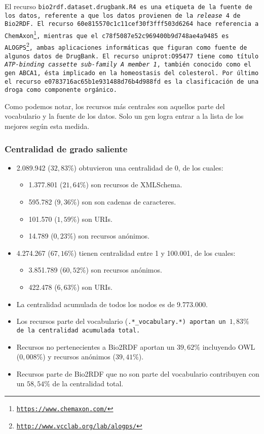 El recurso \tt{bio2rdf.dataset.drugbank.R4} es una etiqueta de la fuente de los
datos, referente a que los datos provienen de la \emph{release} 4 de Bio2RDF.
El recurso \tt{60e815570c1c11cef30f3fff503d6264} hace referencia a 
ChemAxon\footnote{\url{https://www.chemaxon.com/}},
mientras que el \tt{c78f5087e52c969400b9d748ae4a9485} es 
ALOGPS\footnote{\url{http://www.vcclab.org/lab/alogps/}}, ambas aplicaciones
informáticas que figuran como fuente de algunos datos de DrugBank.
El recurso \tt{uniprot:O95477} tiene como título \emph{ATP-binding cassette
sub-family A member 1}, también conocido como el gen ABCA1, ésta implicado en
la homeostasis del colesterol. Por último el recurso 
\tt{e0783716ac65b1e931488d76b4d988fd} es la clasificación de una droga como
componente orgánico.

Como podemos notar, los recursos más centrales son aquellos parte del
vocabulario y la fuente de los datos.
Solo un gen logra entrar a la lista de los mejores según esta medida.

\subsubsection{Centralidad de grado saliente}
\begin{itemize}
  \item 2.089.942 ($32,83\%$) obtuvieron una centralidad de 0, de los cuales:
    \begin{itemize}
      \item 1.377.801 ($21,64\%$) son recursos de XMLSchema.
      \item 595.782 ($9,36\%$) son son cadenas de caracteres.
      \item 101.570 ($1,59\%$) son URIs.
      \item 14.789 ($0,23\%$) son recursos anónimos.
    \end{itemize}
  \item
    4.274.267 ($67,16\%$) tienen centralidad entre 1 y 100.001, de los cuales:
    \begin{itemize}
      \item 3.851.789 ($60,52\%$) son recursos anónimos.
      \item 422.478 ($6,63\%$) son URIs.
    \end{itemize}
  \item La centralidad acumulada de todos los nodos es de 9.773.000.
  \item 
    Los recursos parte del vocabulario (\tt{.*\_vocabulary.*}) aportan un 
    $1,83\%$ de la centralidad acumulada total.
  \item
    Recursos no pertenecientes a Bio2RDF aportan un $39,62\%$ incluyendo OWL 
    ($0,008\%$) y recursos anónimos ($39,41\%$).
  \item 
    Recursos parte de Bio2RDF que no son parte del vocabulario contribuyen con
    un $58,54\%$ de la centralidad total.
\end{itemize}


